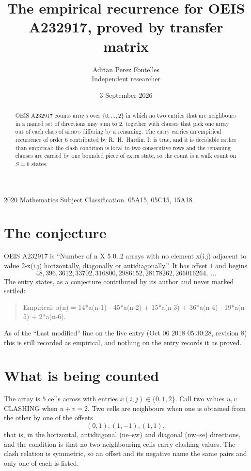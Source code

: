 \documentclass[11pt,a4paper]{article}
\title{The empirical recurrence for OEIS A232917, proved by transfer matrix}
\author{Adrian Perez Fontelles\\ \small Independent researcher}
\date{3 September 2026}
\theoremstyle{plain}
\theoremstyle{definition}
\begin{document}
\maketitle

\begin{abstract}
OEIS A232917 counts arrays over $\{0,\dots,2\}$ in which no two entries that are neighbours in
a named set of directions may sum to $2$, together with clauses that pick one array out of
each class of arrays differing by a renaming. The entry carries an empirical recurrence of
order $6$ contributed by R.~H.~Hardin. It is true, and it is decidable rather than
empirical: the clash condition is local to two consecutive rows and the renaming clauses are
carried by one bounded piece of extra state, so the count is a walk count on $S=6$ states.
\end{abstract}

\noindent\small 2020 Mathematics Subject Classification. 05A15, 05C15, 15A18.\normalsize

\section{The conjecture}

OEIS A232917 is ``Number of n X 5 0..2 arrays with no element x(i,j) adjacent to value 2-x(i,j) horizontally, diagonally or antidiagonally.''. It has offset $1$ and begins
\[
48, 396, 3612, 33702, 316800, 2986152, 28178262, 266016264,\ \dots
\]
The entry states, as a conjecture contributed by its author and never marked settled:
\begin{quote}
Empirical: a(n) = 14*a(n-1) - 45*a(n-2) + 15*a(n-3) + 36*a(n-4) - 19*a(n-5) + 2*a(n-6).
\end{quote}
As of the ``Last modified'' line on the live entry (Oct 06 2018 05:30:28, revision 8) this is still
recorded as empirical, and nothing on the entry records it as proved.

\section{What is being counted}

The array is $5$ cells across with entries $x(i,j)\in\{0,1,2\}$. Call two values $u,v$ CLASHING
when $u+v=2$. Two cells are neighbours when one is obtained from the other by one of
the offsets
\[
(0,1), (1,-1), (1,1),
\]
that is, in the horizontal, antidiagonal (ne--sw) and diagonal (nw--se) directions, and the condition is that no two neighbouring cells carry
clashing values. The clash relation is symmetric, so an offset and its negative name the
same pairs and only one of each is listed.
\end{document}
